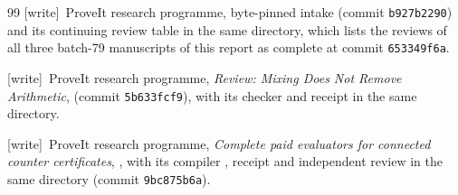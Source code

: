 \documentclass[11pt,letterpaper]{article}
\theoremstyle{definition}
\theoremstyle{remark}
\newcommand{\wtag}{\textup{[write]}}
\begin{document}
\begin{thebibliography}{99}
\wtag\ ProveIt research programme, byte-pinned intake  (commit \texttt{b927b2290}) and its continuing review table  in the same directory, which lists the reviews of all three batch-79 manuscripts of this report as complete at commit \texttt{653349f6a}.

\wtag\ ProveIt research programme, \emph{Review: Mixing Does Not Remove Arithmetic},  (commit \texttt{5b633fcf9}), with its checker  and receipt  in the same directory.

\wtag\ ProveIt research programme, \emph{Complete paid evaluators for connected counter certificates}, , with its compiler , receipt  and independent review  in the same directory (commit \texttt{9bc875b6a}).
\end{thebibliography}
\end{document}
